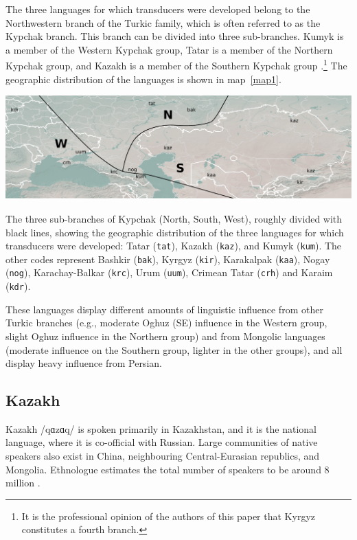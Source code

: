 \documentclass[a4paper,11pt,twocolumn]{article}
\begin{document}
The three languages for which transducers were developed belong to the Northwestern branch of the Turkic family, which is often referred to as the Kypchak branch.  This branch can be divided into three sub-branches.  Kumyk is a member of the Western Kypchak group, Tatar is a member of the Northern Kypchak group, and Kazakh is a member of the Southern Kypchak group \citep[82-83]{histofturkic}.\footnote{It is the professional opinion of the authors of this paper that Kyrgyz constitutes a fourth branch.}   The geographic distribution of the languages is shown in map~\ref{map1}.

\begin{map*}[htbp]
	\includegraphics[width=\textwidth]{map/map}
	\caption{The three sub-branches of Kypchak (North, South, West), roughly divided with black lines, showing the geographic distribution of the three languages for which transducers were developed: Tatar (\texttt{tat}), Kazakh (\texttt{kaz}), and Kumyk (\texttt{kum}). The other codes represent Bashkir (\texttt{bak}), Kyrgyz (\texttt{kir}), Karakalpak (\texttt{kaa}), Nogay (\texttt{nog}), Karachay-Balkar (\texttt{krc}), Urum (\texttt{uum}), Crimean Tatar (\texttt{crh}) and Karaim (\texttt{kdr}).}
	\label{map1}
\end{map*}

These languages display different amounts of linguistic influence from other Turkic branches (e.g., moderate Oghuz (SE) influence in the Western group, slight Oghuz influence in the Northern group) and from Mongolic languages (moderate influence on the Southern group, lighter in the other groups), and all display heavy influence from Persian.

\subsection{Kazakh}
Kazakh /q{\symbl ɑ}z{\symbl ɑ}q/ is spoken primarily in Kazakhstan, and it is the national language, where it is co-official with Russian.  Large communities of native speakers also exist in China, neighbouring Central-Eurasian republics, and Mongolia. Ethnologue estimates
the total number of speakers to be around 8 million \citep{ethnologue}.
\end{document}
